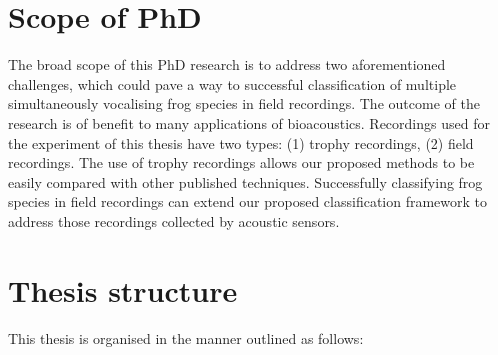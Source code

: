 

\section{Scope of PhD}
The broad scope of this PhD research is to address two aforementioned challenges, which could pave a way to successful classification of multiple simultaneously vocalising frog species in field recordings. The outcome of the research is of benefit to many applications of bioacoustics. Recordings used for the experiment of this thesis have two types: (1) trophy recordings, (2) field recordings. The use of trophy recordings allows our proposed methods to be easily compared with other published techniques. Successfully classifying frog species in field recordings can extend our proposed classification framework to address those recordings collected by acoustic sensors.






\section{Thesis structure}

This thesis is organised in the manner outlined as follows:





